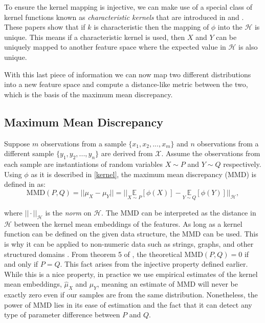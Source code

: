 To ensure the kernel mapping is injective, we can make use of a special class of kernel functions known as \textit{characteristic kernels} that are introduced in \cite{fukumizu2008kernel} and \cite{sriperumbudur2011universality}. These papers show that if $k$ is characteristic then the mapping of $\phi$ into the $\mathcal{H}$ is unique. This means if a characteristic kernel is used, then $X$ and $Y$ can be uniquely mapped to another feature space where the expected value in $\mathcal{H}$ is also unique. 

With this last piece of information we can now map two different distributions into a new feature space and compute a distance-like metric between the two, which is the basis of the maximum mean discrepancy.   %

\subsection{Maximum Mean Discrepancy}
Suppose $m$ observations from a sample $\{x_1, x_2, ..., x_m\}$ and $n$ observations from a different sample $\{y_1, y_2, ..., y_n\}$ are derived from $\mathcal{X}$. Assume the observations from each sample are instantiations of random variables $X \sim  P$ and $Y \sim Q$ respectively. Using $\phi$ as it is described in \ref{kernel}, the maximum mean discrepancy (MMD) is defined in \cite{smola2007hilbert} as:
\begin{equation}
\label{mmd_theory}
\text{MMD}(P,Q)=||\mu_X - \mu_Y ||=|| \underset{X \sim P}{\mathbb{E}}[\phi(X)] -  \underset{Y \sim Q}{\mathbb{E}}[\phi(Y)]||_\mathcal{H},
\end{equation}

where $||\cdot||_\mathcal{H}$ is the \textit{norm} on $\mathcal{H}$. The MMD can be interpreted as the distance in $\mathcal{H}$ between the kernel mean embeddings of the features. As long as a kernel function can be defined on the given data structure, the MMD can be used. This is why it can be applied to non-numeric data such as strings, graphs, and other structured domains \cite{hofmann2008kernel}. From theorem 5 of \cite{gretton2012kernel}, the theoretical MMD$(P,Q) = 0$ if and only if $P=Q$. This fact arises from the injective property defined earlier. While this is a nice property, in practice we use empirical estimates of the kernel mean embeddings, $\hat{\mu}_X $ and $\hat{\mu}_Y$, meaning an estimate of MMD will never be exactly zero even if our samples are from the same distribution. Nonetheless, the power of MMD lies in its ease of estimation and the fact that it can detect any type of parameter difference between $P$ and $Q$. 

